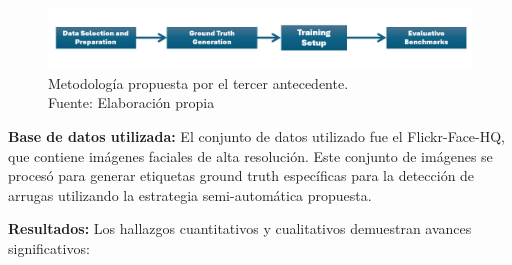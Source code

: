 \begin{enumerate}[label=\textbf{\arabic*.}, leftmargin=2em]
	\begin{figure}[H]
		\begin{center}
			\includegraphics[width=1\textwidth]{2/figures/metoant3.png}
			\caption[Metodología propuesta por el tercer antecedente]{Metodología propuesta por el tercer antecedente.\\
				Fuente: Elaboración propia}
			\label{2:figant3}
		\end{center}
	\end{figure}
\end{enumerate}

\textbf{Base de datos utilizada:}
El conjunto de datos utilizado fue el Flickr-Face-HQ, que contiene imágenes faciales de alta resolución. Este conjunto de imágenes se procesó para generar etiquetas ground truth específicas para la detección de arrugas utilizando la estrategia semi-automática propuesta.

\textbf{Resultados:}
Los hallazgos cuantitativos y cualitativos demuestran avances significativos:

